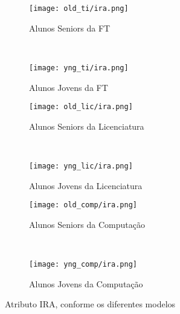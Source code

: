 \clearpage
\begin{figure}[!ht]
    \centering
    \begin{subfigure}[b]{0.48\textwidth}
        \centering
        \texttt{[image: old\_ti/ira.png]}
        \caption{Alunos Seniors da FT}
    \end{subfigure}
    ~
    \begin{subfigure}[b]{0.48\textwidth}
        \centering
        \texttt{[image: yng\_ti/ira.png]}
        \caption{Alunos Jovens da FT}
    \end{subfigure}

    \begin{subfigure}[b]{0.48\textwidth}
        \centering
        \texttt{[image: old\_lic/ira.png]}
        \caption{Alunos Seniors da Licenciatura}
    \end{subfigure}
    ~
    \begin{subfigure}[b]{0.48\textwidth}
        \centering
        \texttt{[image: yng\_lic/ira.png]}
        \caption{Alunos Jovens da Licenciatura}
    \end{subfigure}

    \begin{subfigure}[b]{0.48\textwidth}
        \centering
        \texttt{[image: old\_comp/ira.png]}
        \caption{Alunos Seniors da Computação}
    \end{subfigure}
    ~
    \begin{subfigure}[b]{0.48\textwidth}
        \centering
        \texttt{[image: yng\_comp/ira.png]}
        \caption{Alunos Jovens da Computação}
    \end{subfigure}
    \caption{Atributo IRA, conforme os diferentes modelos}
\end{figure}

